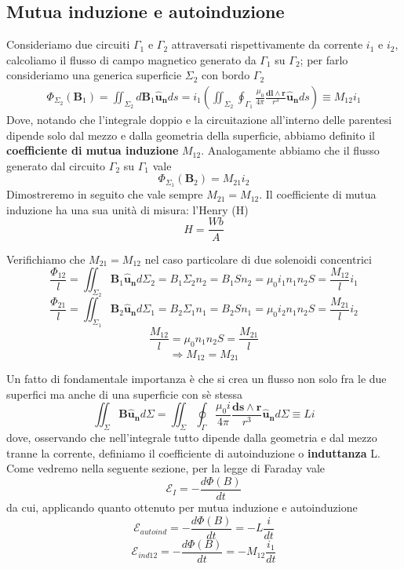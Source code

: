\documentclass[
10pt, %
a4paper, %
oneside, %
headinclude,footinclude, %
BCOR5mm, %
]{scrartcl}
\begin{document}
\subsection{Mutua induzione e autoinduzione}
Consideriamo due circuiti $\Gamma_1$ e $\Gamma_2$ attraversati rispettivamente da corrente \(i_1\) e \(i_2\), calcoliamo il flusso di campo magnetico generato da $\Gamma_1$ su $\Gamma_2$; per farlo consideriamo una generica superficie $\Sigma_2$ con bordo $\Gamma_2$
\begin{align}\label{eq:mutuainduzione}
	\Phi_{\Sigma_2}(\mathbf{B}_1) = \iint_{\Sigma_2}d\mathbf{B}_1\mathbf{\hat{u}_n}ds= i_1\left(\iint_{\Sigma_2}\oint_{\Gamma_1}\frac{\mu_0 }{4\pi}\frac{\mathbf{dl}\wedge\mathbf{r}}{r^3}\mathbf{\hat{u}_n}ds\right)\equiv M_{12}i_1
\end{align}
Dove, notando che l'integrale doppio e la circuitazione all'interno delle parentesi dipende solo dal mezzo e dalla geometria della superficie, abbiamo definito il \textbf{coefficiente di mutua induzione} \(M_{12}\).
Analogamente abbiamo che il flusso generato dal circuito \(\Gamma_2\) su $\Gamma_1$ vale
\[\Phi_{\Sigma_1}(\mathbf{B}_2)= M_{21}i_2\]
Dimostreremo in seguito che vale sempre \(M_{21} = M_{12}\). Il coefficiente di mutua induzione ha una sua unità di misura: l'Henry (H)
\[H = \frac{Wb}{A}\]
\begin{esercizio}
Verifichiamo che \(M_{21} = M_{12}\) nel caso particolare di due solenoidi concentrici
\[\frac{\Phi_{12}}{l}=\iint_{\Sigma_2}\mathbf{B}_1\mathbf{\hat{u}_n}d\Sigma_2 = B_1\Sigma_2 n_2=B_1 S n_2 = \mu_0 i_1 n_1 n_2 S = \frac{M_{12}}{l}i_1\]
\[\frac{\Phi_{21}}{l}=\iint_{\Sigma_1}\mathbf{B}_2\mathbf{\hat{u}_n}d\Sigma_1 = B_2\Sigma_1 n_1=B_2 S n_1 = \mu_0 i_2 n_1 n_2 S = \frac{M_{21}}{l}i_2\]
\[\frac{M_{12}}{l}=\mu_0 n_1 n_2 S=\frac{M_{21}}{l}\]
\[\Rightarrow M_{12} = M_{21}\]
\end{esercizio}
Un fatto di fondamentale importanza è che si crea un flusso non solo fra le due superfici ma anche di una superficie con sè stessa
\[\iint_{\Sigma}\mathbf{B}\mathbf{\hat{u}_n}d\Sigma = \iint_{\Sigma}\oint_{\Gamma}\frac{\mu_0 i }{4\pi}\frac{\mathbf{ds}\wedge\mathbf{r}}{r^3}\mathbf{\hat{u}_n}d\Sigma\equiv L i\]
dove, osservando che nell'integrale tutto dipende dalla geometria e dal mezzo tranne la corrente, definiamo il coefficiente di autoinduzione o \textbf{induttanza} L.\\
Come vedremo nella seguente sezione, per la legge di Faraday vale 
\[\mathcal{E}_I = -\frac{d\Phi(B)}{dt}\]
da cui, applicando quanto ottenuto per mutua induzione e autoinduzione
\[\mathcal{E}_{autoind} = -\frac{d\Phi(B)}{dt} =  -L \frac{i}{dt}  \]
\[\mathcal{E}_{ind12} = -\frac{d\Phi(B)}{dt} =  -M_12 \frac{i_1}{dt} \]
\newpage
\end{document}
